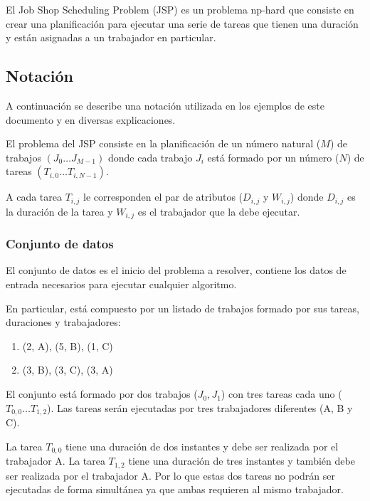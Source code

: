 \begin{keynotebox}
    El Job Shop Scheduling Problem (JSP) es un problema np-hard que
    consiste en crear una planificación
    para ejecutar una serie de tareas que tienen una duración y están asignadas
    a un trabajador en particular.
\end{keynotebox}

\subsection{Notación}

A continuación se describe una notación utilizada en los ejemplos
de este documento y en diversas explicaciones.

El problema del JSP consiste en la planificación de un número natural ($M$)
de trabajos $(J_0 \dots J_{M-1})$ donde cada trabajo $J_i$
está formado por un número ($N$) de tareas $(T_{i,0} \dots T_{i,N-1})$.

A cada tarea $T_{i,j}$ le corresponden el par de atributos ($D_{i,j}$ y $W_{i,j}$)
donde $D_{i,j}$ es la duración de la tarea
y $W_{i,j}$ es el trabajador que la debe ejecutar.

\subsubsection{Conjunto de datos}

El conjunto de datos es el inicio del problema a resolver,
contiene los datos de entrada necesarios para ejecutar cualquier
algoritmo.

En particular, está compuesto por un listado de trabajos
formado por sus tareas, duraciones y trabajadores:
\begin{enumerate}[start=0, itemsep=0.25px]
    \item (2, A), (5, B), (1, C)
    \item (3, B), (3, C), (3, A)
\end{enumerate}
El conjunto está formado por dos trabajos ($J_0, J_1$)
con tres tareas cada uno ($T_{0,0} \dots T_{1,2}$).
Las tareas serán ejecutadas por tres trabajadores diferentes (A, B y C).

La tarea $T_{0,0}$ tiene una duración de dos instantes y
debe ser realizada por el trabajador A.
La tarea $T_{1,2}$ tiene una duración de tres instantes y
también debe ser realizada por el trabajador A.
Por lo que estas dos tareas no podrán ser ejecutadas de forma simultánea ya que ambas requieren al
mismo trabajador.

